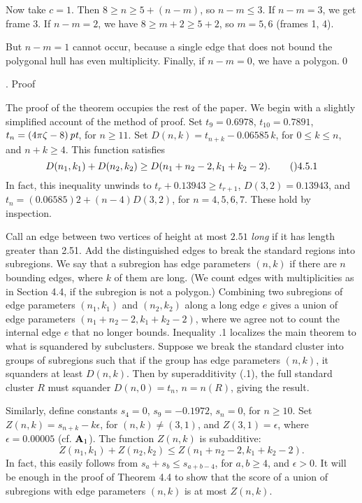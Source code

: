 Now take $c=1$.    Then $8\ge n\ge 5+(n-m)$,
so $n-m\le 3$.  If $n-m=3$, we get frame 3.
If $n-m=2$, we have $8\ge m+2\ge 5+2$, so $m=5,6$ (frames 1, 4).

But $n-m=1$ cannot occur, because a single edge that does not bound 
the polygonal hull has
even multiplicity.  Finally, if $n-m=0$, we have a  polygon.\qed
\enddemo


\subhead {}. Proof\endsubhead

The proof of the theorem occupies the rest of the paper.  We begin with
a slightly simplified account of the method of proof.
Set $t_9=0.6978$, $t_{10}= 0.7891$, $t_n=(4\pi\zeta-8)\,\hbox{\it pt}$,
for $n\ge 11$.
Set $D(n,k) = t_{n+k} - 0.06585\,k$, for $0\le k\le n$, and $n+k\ge 4$.
This function satisfies
$$D(n_1,k_1)+D(n_2,k_2)\ge D(n_1+n_2-2,k_1+k_2-2).\tag \refz 4.5.1$$
In fact, this inequality unwinds to $t_r+0.13943\ge t_{r+1}$, 
$D(3,2)=0.13943$, and $t_n =(0.06585)2+(n-4)D(3,2)$, for $n=4,5,6,7$.
These hold  by inspection.

Call an edge between two vertices of height at most $2.51$ {\it long\/}
if it has length
greater than 2.51.  
Add the distinguished edges to break the standard regions
into subregions.
We say that a subregion has edge parameters
$(n,k)$ if there
are $n$ bounding edges, where $k$ of them are long.  
(We count edges with multiplicities as in Section 4.4, 
if the subregion is
not a polygon.)  Combining
two subregions of edge parameters $(n_1,k_1)$ and $(n_2,k_2)$ along a long edge
$e$
gives a union of edge parameters $(n_1+n_2-2,k_1+k_2-2)$,
where we agree not to count the internal edge $e$ that no longer bounds.
  Inequality .1
localizes the main theorem to what is squandered by subclusters.
Suppose we break the standard cluster into groups of subregions such
that if the group has edge parameters $(n,k)$, it squanders at least $D(n,k)$.
Then by superadditivity (.1), the full standard cluster $R$ must
squander $D(n,0) = t_n$, $n=n(R)$, giving the result.

Similarly, define constants $s_4=0$, 
$s_9 = -0.1972$, $s_{n}=0$,
for $n\ge10$.  Set $Z(n,k) = s_{n+k}-k\epsilon$, for $(n,k)\ne (3,1)$,
and $Z(3,1)=\epsilon$,
where $\epsilon=0.00005$ (cf. ${\bold A}_1$).
The function $Z(n,k)$ is subadditive:
	$$Z(n_1,k_1)+Z(n_2,k_2) \le Z(n_1+n_2-2,k_1+k_2-2).$$
In fact, this easily follows from $s_a+s_b\le s_{a+b-4}$, for
$a,b\ge 4$, and
$\epsilon>0$.
It will be enough in the proof of Theorem 4.4
to show that the score of a union of subregions with
edge parameters $(n,k)$ is at most $Z(n,k)$.  

